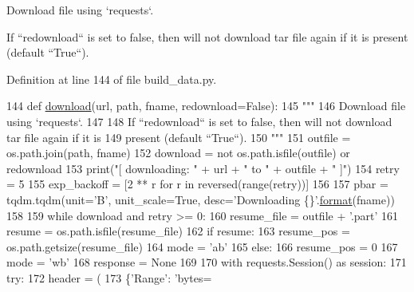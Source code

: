\begin{DoxyVerb}Download file using `requests`.

If ``redownload`` is set to false, then will not download tar file again if it is
present (default ``True``).
\end{DoxyVerb}
 

Definition at line 144 of file build\+\_\+data.\+py.


\begin{DoxyCode}
144 \textcolor{keyword}{def }\hyperlink{namespaceparlai_1_1core_1_1build__data_ab74f0e428f05e5d91fa93c8afb367622}{download}(url, path, fname, redownload=False):
145     \textcolor{stringliteral}{"""}
146 \textcolor{stringliteral}{    Download file using `requests`.}
147 \textcolor{stringliteral}{}
148 \textcolor{stringliteral}{    If ``redownload`` is set to false, then will not download tar file again if it is}
149 \textcolor{stringliteral}{    present (default ``True``).}
150 \textcolor{stringliteral}{    """}
151     outfile = os.path.join(path, fname)
152     download = \textcolor{keywordflow}{not} os.path.isfile(outfile) \textcolor{keywordflow}{or} redownload
153     print(\textcolor{stringliteral}{"[ downloading: "} + url + \textcolor{stringliteral}{" to "} + outfile + \textcolor{stringliteral}{" ]"})
154     retry = 5
155     exp\_backoff = [2 ** r \textcolor{keywordflow}{for} r \textcolor{keywordflow}{in} reversed(range(retry))]
156 
157     pbar = tqdm.tqdm(unit=\textcolor{stringliteral}{'B'}, unit\_scale=\textcolor{keyword}{True}, desc=\textcolor{stringliteral}{'Downloading \{\}'}.\hyperlink{namespaceparlai_1_1chat__service_1_1services_1_1messenger_1_1shared__utils_a32e2e2022b824fbaf80c747160b52a76}{format}(fname))
158 
159     \textcolor{keywordflow}{while} download \textcolor{keywordflow}{and} retry >= 0:
160         resume\_file = outfile + \textcolor{stringliteral}{'.part'}
161         resume = os.path.isfile(resume\_file)
162         \textcolor{keywordflow}{if} resume:
163             resume\_pos = os.path.getsize(resume\_file)
164             mode = \textcolor{stringliteral}{'ab'}
165         \textcolor{keywordflow}{else}:
166             resume\_pos = 0
167             mode = \textcolor{stringliteral}{'wb'}
168         response = \textcolor{keywordtype}{None}
169 
170         with requests.Session() \textcolor{keyword}{as} session:
171             \textcolor{keywordflow}{try}:
172                 header = (
173                     \{\textcolor{stringliteral}{'Range'}: \textcolor{stringliteral}{'bytes=%
}
\end{DoxyCode}
